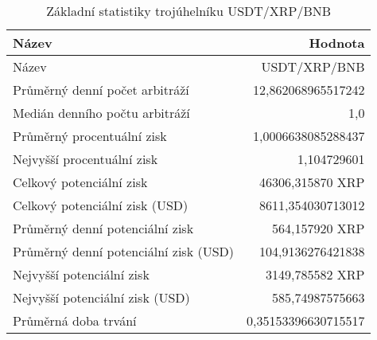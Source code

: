 \begin{table}\centering
\caption{Základní statistiky trojúhelníku USDT/XRP/BNB}
\label{USDTXRPBNB_stats}
\begin{tabular}{|| l | r ||}
\hline Název & Hodnota \\ 
\hline\hline Název & USDT/XRP/BNB \\ 
\hline Průměrný denní počet arbitráží & 12,862068965517242 \\ 
\hline Medián denního počtu arbitráží & 1,0 \\ 
\hline Průměrný procentuální zisk & 1,0006638085288437 \\ 
\hline Nejvyšší procentuální zisk & 1,104729601 \\ 
\hline Celkový potenciální zisk & 46306,315870 XRP \\ 
\hline Celkový potenciální zisk (USD) & 8611,354030713012 \\ 
\hline Průměrný denní potenciální zisk & 564,157920 XRP \\ 
\hline Průměrný denní potenciální zisk (USD) & 104,9136276421838 \\ 
\hline Nejvyšší potenciální zisk & 3149,785582 XRP \\ 
\hline Nejvyšší potenciální zisk (USD) & 585,74987575663 \\ 
\hline Průměrná doba trvání & 0,35153396630715517 \\ 
\hline
\end{tabular}
\end{table}